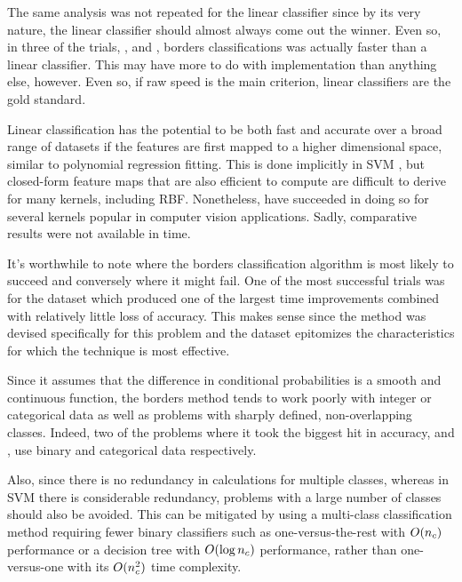 The same analysis was not repeated for the linear classifier since by its very 
nature, the linear classifier should almost always come out the winner.
Even so, in three of the trials, ,  and
, borders classifications was actually faster than a linear
classifier. This may have more to do with implementation than anything else,
however. Even so, if raw speed is the main criterion, linear classifiers are
the gold standard. 

Linear classification has the potential to be both fast
and accurate over a broad range of datasets if the features are first mapped
to a higher dimensional space, similar to polynomial regression fitting.
This is done implicitly in SVM \citep{Mueller_etal2001}, but closed-form
feature maps that are also efficient to compute
are difficult to derive for many kernels, including RBF. 
Nonetheless, \citet{Vedaldi_Zisserman2012} have succeeded in doing so for
several kernels popular in computer vision applications.
Sadly, comparative results were not available in time.

It's worthwhile to note where the borders classification algorithm 
is most likely to succeed and conversely where it might fail.
One of the most successful trials was for the  dataset which produced one of
the largest time improvements combined with relatively little loss of accuracy.
This makes sense since the method was devised specifically for this problem and
the  dataset epitomizes the characteristics for which the technique is most
effective.

Since it assumes that the difference in conditional probabilities is a
smooth and continuous function, the borders method 
tends to work poorly with integer or categorical data as well as problems
with sharply defined, non-overlapping classes.
Indeed, two of the problems where it took the biggest hit in accuracy,  and , 
use binary and categorical data respectively.

Also, since there is no redundancy in calculations for multiple classes, 
whereas in SVM there is considerable redundancy, problems with a large number of
classes should also be avoided.
This can be mitigated by using a multi-class classification method
requiring fewer binary classifiers such as one-versus-the-rest with $O(n_c)$
performance or a decision tree with $O(\log n_c)$ performance, rather than
one-versus-one with its $O(n_c^2)$ time complexity.


